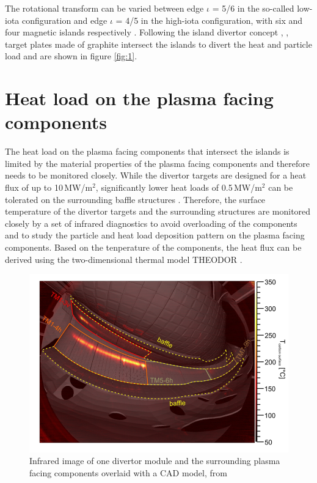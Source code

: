 The rotational transform can be varied between edge $\iota$ = 5/6 in the so-called low-iota configuration and edge $\iota$ = 4/5 in the high-iota configuration, with six and four magnetic islands respectively \cite{Knieps2021}. Following the island divertor concept \cite{Konig2002}, \cite{Renner2002}, target plates made of graphite intersect the islands to divert the heat and particle load and are shown in figure \ref{fig:1}.


\section{Heat load on the plasma facing components}

The heat load on the plasma facing components that intersect the islands is limited by the material properties of the plasma facing components and therefore needs to be monitored closely. While the divertor targets are designed for a heat flux of up to 10\,MW/m$^2$, significantly lower heat loads of 0.5\,MW/m$^2$ can be tolerated on the surrounding baffle structures \cite{Jakubowski2018}. Therefore, the surface temperature of the divertor targets and the surrounding structures are monitored closely by a set of infrared diagnostics to avoid overloading of the components and to study the particle and heat load deposition pattern on the plasma facing components. Based on the tenperature of the components, the heat flux can be derived using the two-dimensional thermal model THEODOR \cite{Sieglin2015}.
\begin{figure}[!htb]
    \centering
    \includegraphics[scale = 0.5]{images/ir_image.png}
    \caption{Infrared image of one divertor module and the surrounding plasma facing components overlaid with a CAD model, from \cite{Jakubowski2018}} \label{fig:2}
\end{figure}
